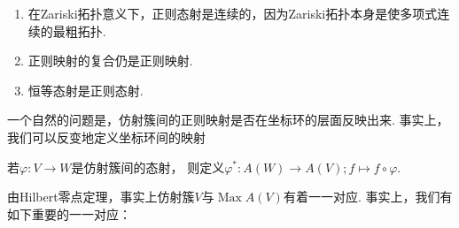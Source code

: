     \begin{remark}
        \begin{enumerate}
          \item 在Zariski拓扑意义下，正则态射是连续的，因为Zariski拓扑本身是使多项式连续的最粗拓扑.
          \item 正则映射的复合仍是正则映射.
          \item 恒等态射是正则态射.
        \end{enumerate}
    \end{remark}

    一个自然的问题是，仿射簇间的正则映射是否在坐标环的层面反映出来. 
    事实上，我们可以反变地定义坐标环间的映射

    \begin{definition}
        若$\varphi\colon V \rightarrow W$是仿射簇间的态射，
        则定义$\varphi^{*}\colon A(W) \rightarrow A(V);f \mapsto f \circ \varphi$.
    \end{definition}

    由Hilbert零点定理，事实上仿射簇$V$与$\operatorname{Max}A(V)$有着一一对应. 
    事实上，我们有如下重要的一一对应：

